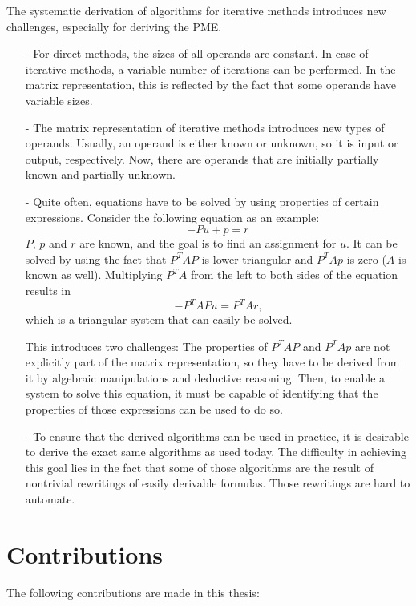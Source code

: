 The systematic derivation of algorithms for iterative methods introduces new challenges, especially  for deriving the PME.
%
\begin{itemize}
\item[-] For direct methods, the sizes of all operands are constant. In case of iterative methods, a variable number of iterations can be performed. In the matrix representation, this is reflected by the fact that some operands have variable sizes.
\item[-] The matrix representation of iterative methods introduces new types of op\-er\-ands. Usually, an operand is either known or unknown, so it is input or output, respectively. Now, there are operands that are initially partially known and partially unknown.
\item[-] Quite often, equations have to be solved by using properties of certain expressions. Consider the following equation as an example:
%
$$-P u + p = r$$
%
$P$, $p$ and $r$ are known, and the goal is to find an assignment for $u$. It can be solved by using the fact that $P^T A P$ is lower triangular and $P^T A p$ is zero ($A$ is known as well). Multiplying $P^T A$ from the left to both sides of the equation results in
%
$$-P^T A P u = P^T A r \text{,}$$
%
which is a triangular system that can easily be solved.

This introduces two challenges: The properties of $P^T A P$ and $P^T A p$ are not explicitly part of the matrix representation, so they have to be derived from it by algebraic manipulations and deductive reasoning. Then, to enable a system to solve this equation, it must be capable of identifying that  the properties of those expressions can be used to do so.
\item[-] To ensure that the derived algorithms can be used in practice, it is desirable to derive the exact same algorithms as used today. The difficulty in achieving this goal lies in the fact that some of those algorithms are the result of nontrivial rewritings of easily derivable formulas. Those rewritings are hard to automate.
\end{itemize}
%




\section{Contributions}

The following contributions are made in this thesis:

